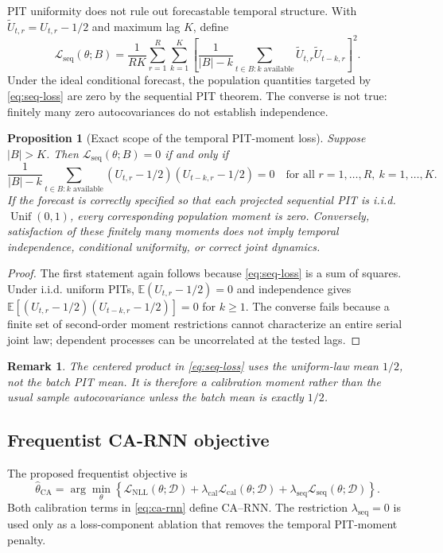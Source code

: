 \documentclass[11pt]{article}
\newtheorem{proposition}[definition]{Proposition}
\newtheorem{remark}[definition]{Remark}
\newcommand{\E}{\mathbb{E}}
\newcommand{\D}{\mathcal{D}}
\newcommand{\CA}{\mathrm{CA}}
\begin{document}
PIT uniformity does not rule out forecastable temporal structure. With
$\widetilde U_{t,r}=U_{t,r}-1/2$ and maximum lag $K$, define
\begin{equation}
\mathcal L_{\mathrm{seq}}(\theta;B)
=\frac{1}{RK}\sum_{r=1}^R\sum_{k=1}^K
\left[
\frac{1}{|B|-k}\sum_{t\in B:k\text{ available}}
\widetilde U_{t,r}\widetilde U_{t-k,r}
\right]^2.
\label{eq:seq-loss}
\end{equation}
Under the ideal conditional forecast, the population quantities targeted by
\eqref{eq:seq-loss} are zero by the sequential PIT theorem. The converse is not
true: finitely many zero autocovariances do not establish independence.

\begin{proposition}[Exact scope of the temporal PIT-moment loss]
Suppose $|B|>K$. Then $\mathcal L_{\mathrm{seq}}(\theta;B)=0$ if and only if
\[
 \frac{1}{|B|-k}\sum_{t\in B:k\text{ available}}
 (U_{t,r}-1/2)(U_{t-k,r}-1/2)=0
 \quad\text{for all }r=1,\ldots,R,\ k=1,\ldots,K.
\]
If the forecast is correctly specified so that each projected sequential PIT is
i.i.d. $\operatorname{Unif}(0,1)$, every corresponding population moment is zero.
Conversely, satisfaction of these finitely many moments does not imply temporal
independence, conditional uniformity, or correct joint dynamics.
\end{proposition}

\begin{proof}
The first statement again follows because \eqref{eq:seq-loss} is a sum of squares.
Under i.i.d. uniform PITs, $\E(U_{t,r}-1/2)=0$ and independence gives
$\E[(U_{t,r}-1/2)(U_{t-k,r}-1/2)]=0$ for $k\geq1$. The converse fails because a
finite set of second-order moment restrictions cannot characterize an entire
serial joint law; dependent processes can be uncorrelated at the tested lags.
\end{proof}

\begin{remark}
The centered product in \eqref{eq:seq-loss} uses the uniform-law mean $1/2$, not
the batch PIT mean. It is therefore a calibration moment rather than the usual
sample autocovariance unless the batch mean is exactly $1/2$.
\end{remark}

\subsection{Frequentist CA-RNN objective}

The proposed frequentist objective is
\begin{equation}
\widehat\theta_{\CA}
=\arg\min_\theta\left\{
\mathcal L_{\mathrm{NLL}}(\theta;\D)
+\lambda_{\mathrm{cal}}\mathcal L_{\mathrm{cal}}(\theta;\D)
+\lambda_{\mathrm{seq}}\mathcal L_{\mathrm{seq}}(\theta;\D)
\right\}.
\label{eq:ca-rnn}
\end{equation}
Both calibration terms in \eqref{eq:ca-rnn} define CA--RNN. The restriction
$\lambda_{\mathrm{seq}}=0$ is used only as a loss-component ablation that removes
the temporal PIT-moment penalty.
\end{document}
